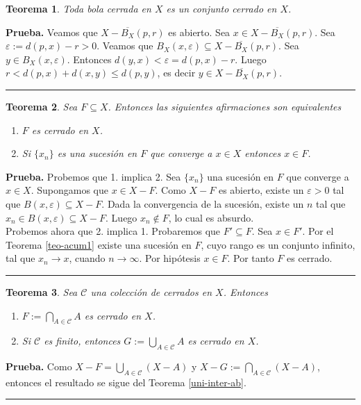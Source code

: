 \documentclass[x11names, 12pt]{book}
\newtheorem{teorema}{Teorema}
\newenvironment{prueba}[1][Prueba]{\noindent\textbf{#1.} }{\ \rule{0.5em}{0.5em}}
\begin{document}
\begin{teorema}
Toda bola cerrada en $X$ es un conjunto cerrado en $X$.
\end{teorema}
\begin{prueba}
Veamos que $X-\overline{B_X}(p,r)$ es abierto. Sea $x \in X-\overline{B_X}(p,r).$ Sea $\varepsilon := d(p,x)-r>0.$ Veamos que $B_X(x,\varepsilon)\subseteq X-\overline{B_X}(p,r).$ Sea $y\in B_X(x,\varepsilon).$ Entonces $d(y,x) <\varepsilon=d(p,x)-r.$  Luego $r<d(p,x)+d(x,y)\leq d(p,y)$, es decir $y\in X-\overline{B_X}(p,r).$
\end{prueba}

\begin{teorema}
Sea $F\subseteq X$. Entonces las siguientes afirmaciones son equivalentes
\begin{enumerate}
    \item $F$ es cerrado en $X$.
    \item Si $\{x_n\}$ es una sucesión en $F$ que converge a $x\in X$ entonces $x\in F$.
\end{enumerate}
\end{teorema}
\begin{prueba}
Probemos que 1. implica 2. Sea $\{x_n\}$ una sucesión en $F$ que converge a $x\in X$. Supongamos que $x\in X-F$. Como $X-F$ es abierto, existe un $\varepsilon >0$ tal que $B(x, \varepsilon)\subseteq X-F$. Dada la convergencia de la sucesión, existe un $n$ tal que $x_n\in B(x, \varepsilon)\subseteq X-F$. Luego $x_n \notin F $, lo cual es absurdo.\\
Probemos ahora que 2. implica 1. Probaremos que $F' \subseteq F$. Sea $x\in F'$. Por el Teorema \ref{teo-acum1} existe una sucesión en $F$, cuyo rango es un conjunto infinito, tal que $x_n \to x$, cuando $n\to \infty$.  Por hipótesis $x\in F$. Por tanto $F$ es cerrado.
\end{prueba}

\begin{teorema}
Sea $\mathcal{C}$ una colección de cerrados en $X$. Entonces
\begin{enumerate}
    \item $F:=\bigcap_{A\in \mathcal{C}}A$ es cerrado en $X$.
    \item Si $\mathcal{C}$ es finito, entonces $G:=\bigcup_{A\in \mathcal{C}}A$ es cerrado en $X$.
\end{enumerate}
\end{teorema}
\begin{prueba}
Como $X-F=\bigcup_{A\in \mathcal{C}}(X-A)$ y $X-G:=\bigcap_{A\in \mathcal{C}}(X-A)$, entonces el resultado se sigue del Teorema \ref{uni-inter-ab}.
\end{prueba}
\end{document}
